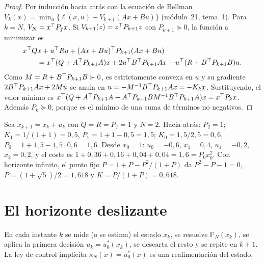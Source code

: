 \begin{proof}
Por inducción hacia atrás con la ecuación de Bellman $V_k(x)=\min_u\{\ell(x,u)+V_{k+1}(Ax+Bu)\}$ (módulo~21, tema~1). Para $k=N$, $V_N=x^{\top} P_fx$. Si $V_{k+1}(z)=z^{\top} P_{k+1}z$ con $P_{k+1}\succeq0$, la función a minimizar es
\[
\begin{aligned}
&x^{\top} Qx+u^{\top} Ru+(Ax+Bu)^{\top} P_{k+1}(Ax+Bu)\\
&\qquad=x^{\top}(Q+A^{\top} P_{k+1}A)x+2u^{\top} B^{\top} P_{k+1}Ax+u^{\top}(R+B^{\top} P_{k+1}B)u .
\end{aligned}
\]
Como $M=R+B^{\top} P_{k+1}B\succ0$, es estrictamente convexa en $u$ y su gradiente $2B^{\top} P_{k+1}Ax+2Mu$ se anula en $u=-M^{-1}B^{\top} P_{k+1}Ax=-K_kx$. Sustituyendo, el valor mínimo es $x^{\top}(Q+A^{\top} P_{k+1}A-A^{\top} P_{k+1}BM^{-1}B^{\top} P_{k+1}A)x=x^{\top} P_kx$. Además $P_k\succeq0$, porque es el mínimo de una suma de términos no negativos.
\end{proof}

\begin{ejemplo}\label{ej:lqr}
Sea $x_{k+1}=x_k+u_k$ con $Q=R=P_f=1$ y $N=2$. Hacia atrás: $P_2=1$; $K_1=1/(1+1)=0{,}5$, $P_1=1+1-0{,}5=1{,}5$; $K_0=1{,}5/2{,}5=0{,}6$, $P_0=1+1{,}5-1{,}5\cdot0{,}6=1{,}6$. Desde $x_0=1$: $u_0=-0{,}6$, $x_1=0{,}4$, $u_1=-0{,}2$, $x_2=0{,}2$, y el coste es $1+0{,}36+0{,}16+0{,}04+0{,}04=1{,}6=P_0x_0^{2}$. Con horizonte infinito, el punto fijo $P=1+P-P^{2}/(1+P)$ da $P^{2}-P-1=0$, $P=(1+\sqrt5)/2=1{,}618$ y $K=P/(1+P)=0{,}618$.
\end{ejemplo}

\section{El horizonte deslizante}

\begin{definicion}\label{def:mpc}
En cada instante $k$ se mide (o se estima) el estado $x_k$, se resuelve $\mathbb P_N(x_k)$, se aplica la primera decisión $u_k=u_0^{*}(x_k)$, se descarta el resto y se repite en $k+1$. La ley de control implícita $\kappa_N(x)=u_0^{*}(x)$ es una realimentación del estado.
\end{definicion}

